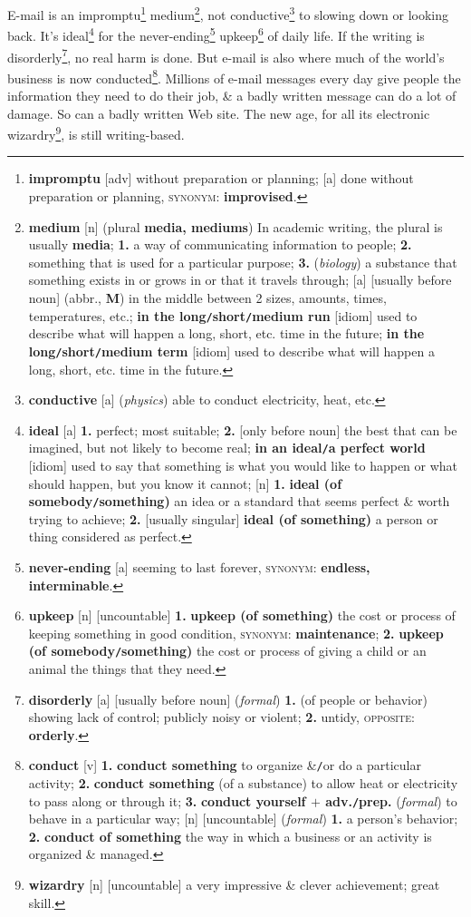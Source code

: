 \documentclass[oneside]{book}
\numberwithin{equation}{section}
\begin{document}
E-mail is an impromptu\footnote{\textbf{impromptu} [adv] without preparation or planning; [a] done without preparation or planning, \textsc{synonym}: \textbf{improvised}.} medium\footnote{\textbf{medium} [n] (plural \textbf{media, mediums}) In academic writing, the plural is usually \textbf{media}; \textbf{1.} a way of communicating information to people; \textbf{2.} something that is used for a particular purpose; \textbf{3.} (\textit{biology}) a substance that something exists in or grows in or that it travels through; [a] [usually before noun] (abbr., \textbf{M}) in the middle between 2 sizes, amounts, times, temperatures, etc.; \textbf{in the long\texttt{/}short\texttt{/}medium run} [idiom] used to describe what will happen a long, short, etc. time in the future; \textbf{in the long\texttt{/}short\texttt{/}medium term} [idiom] used to describe what will happen a long, short, etc. time in the future.}, not conductive\footnote{\textbf{conductive} [a] (\textit{physics}) able to conduct electricity, heat, etc.} to slowing down or looking back. It's ideal\footnote{\textbf{ideal} [a] \textbf{1.} perfect; most suitable; \textbf{2.} [only before noun] the best that can be imagined, but not likely to become real; \textbf{in an ideal\texttt{/}a perfect world} [idiom] used to say that something is what you would like to happen or what should happen, but you know it cannot; [n] \textbf{1.} \textbf{ideal (of somebody\texttt{/}something)} an idea or a standard that seems perfect \& worth trying to achieve; \textbf{2.} [usually singular] \textbf{ideal (of something)} a person or thing considered as perfect.} for the never-ending\footnote{\textbf{never-ending} [a] seeming to last forever, \textsc{synonym}: \textbf{endless, interminable}.} upkeep\footnote{\textbf{upkeep} [n] [uncountable] \textbf{1.} \textbf{upkeep (of something)} the cost or process of keeping something in good condition, \textsc{synonym}: \textbf{maintenance}; \textbf{2.} \textbf{upkeep (of somebody\texttt{/}something)} the cost or process of giving a child or an animal the things that they need.} of daily life. If the writing is disorderly\footnote{\textbf{disorderly} [a] [usually before noun] (\textit{formal}) \textbf{1.} (of people or behavior) showing lack of control; publicly noisy or violent; \textbf{2.} untidy, \textsc{opposite}: \textbf{orderly}.}, no real harm is done. But e-mail is also where much of the world's business is now conducted\footnote{\textbf{conduct} [v] \textbf{1.} \textbf{conduct something} to organize \&\texttt{/}or do a particular activity; \textbf{2.} \textbf{conduct something} (of a substance) to allow heat or electricity to pass along or through it; \textbf{3.} \textbf{conduct yourself $+$ adv.\texttt{/}prep.} (\textit{formal}) to behave in a particular way; [n] [uncountable] (\textit{formal}) \textbf{1.} a person's behavior; \textbf{2.} \textbf{conduct of something} the way in which a business or an activity is organized \& managed.}. Millions of e-mail messages every day give people the information they need to do their job, \& a badly written message can do a lot of damage. So can a badly written Web site. The new age, for all its electronic wizardry\footnote{\textbf{wizardry} [n] [uncountable] a very impressive \& clever achievement; great skill.}, is still writing-based.
\end{document}
